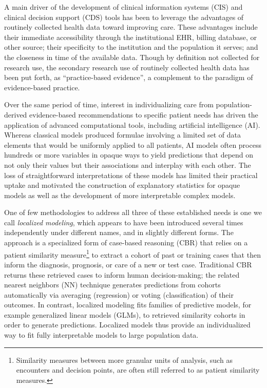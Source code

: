 \documentclass{article}
\begin{document}
A main driver of the development of clinical information systems (CIS)
and clinical decision support (CDS) tools has been to leverage the
advantages of routinely collected health data toward improving care.
These advantages include their immediate accessibility through the
institutional EHR, billing database, or other source; their specificity
to the institution and the population it serves; and the closeness in
time of the available data. Though by definition not collected for
research use, the secondary research use of routinely collected health
data has been put forth, as ``practice-based evidence'', a complement to
the paradigm of evidence-based practice.

Over the same period of time, interest in individualizing care from
population-derived evidence-based recommendations to specific patient
needs has driven the application of advanced computational tools,
including artificial intelligence (AI). Whereas classical models
produced formulae involving a limited set of data elements that would be
uniformly applied to all patients, AI models often process hundreds or
more variables in opaque ways to yield predictions that depend on not
only their values but their associations and interplay with each other.
The loss of straightforward interpretations of these models has limited
their practical uptake and motivated the construction of explanatory
statistics for opaque models as well as the development of more
interpretable complex models.

One of few methodologies to address all three of these established needs
is one we call \emph{localized modeling}, which appears to have been
introduced several times independently under different names, and in
slightly different forms. The approach is a specialized form of
case-based reasoning (CBR) that relies on a patient similarity
measure\footnote{Similarity measures between more granular units of
  analysis, such as encounters and decision points, are often still
  referred to as patient similarity measures.} to extract a cohort of
past or training cases that then inform the diagnosis, prognosis, or
care of a new or test case. Traditional CBR returns these retrieved
cases to inform human decision-making; the related nearest neighbors
(NN) technique generates predictions from cohorts automatically via
averaging (regression) or voting (classification) of their outcomes. In
contrast, localized modeling fits families of predictive models, for
example generalized linear models (GLMs), to retrieved similarity
cohorts in order to generate predictions. Localized models thus provide
an individualized way to fit fully interpretable models to large
population data.
\end{document}
